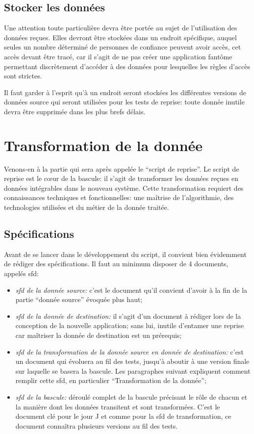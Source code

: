 \documentclass{book}
\begin{document}
\section{Stocker les données}

Une attention toute particulière devra être portée au sujet de l'utilisation des données reçues. Elles devront être stockées dans un endroit spécifique, auquel seules un nombre déterminé de personnes de confiance peuvent avoir accès, cet accès devant être tracé, car il s'agit de ne pas créer une application fantôme permettant discrètement d'accéder à des données pour lesquelles les règles d'accès sont strictes.

Il faut garder à l'esprit qu'à un endroit seront stockées les différentes versions de données source qui seront utilisées pour les tests de reprise: toute donnée inutile devra être supprimée dans les plus brefs délais.

\chapter{Transformation de la donnée}

Venons-en à la partie qui sera après appelée le ``script de reprise''. Le script de reprise est le cœur de la bascule: il s'agit de transformer les données reçues en données intégrables dans le nouveau système. Cette transformation requiert des connaissances techniques et fonctionnelles: une maîtrise de l'algorithmie, des technologies utilisées et du métier de la donnée traitée.

\section{Spécifications}

Avant de se lancer dans le développement du script, il convient bien évidemment de rédiger des spécifications. Il faut au minimum disposer de 4 documents, appelés \gls{sfd}:

\begin{itemize}
 \item \textit{\gls{sfd} de la donnée source:} c'est le document qu'il convient d'avoir à la fin de la partie ``donnée source'' évoquée plus haut;
 \item \textit{\gls{sfd} de la donnée de destination:} il s'agit d'un document à rédiger lors de la conception de la nouvelle application; sans lui, inutile d'entamer une reprise car maîtriser la donnée de destination est un prérequis;
 \item \textit{\gls{sfd} de la transformation de la donnée source en donnée de destination:} c'est un document qui évoluera au fil des tests, jusqu'à aboutir à une version finale sur laquelle se basera la bascule. Les paragraphes suivant expliquent comment remplir cette \gls{sfd}, en particulier ``Transformation de la donnée'';
 \item \textit{\gls{sfd} de la bascule:} déroulé complet de la bascule précisant le rôle de chacun et la manière dont les données transitent et sont transformées. C'est le document clé pour le jour J et comme pour la \gls{sfd} de transformation, ce document connaîtra plusieurs versions au fil des tests.
\end{itemize}
\end{document}
